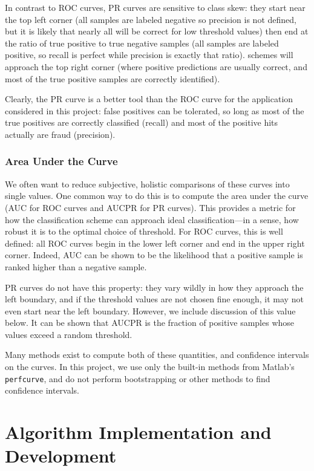 \documentclass{article}
\begin{document}
In contrast to ROC curves, PR curves are sensitive to class skew: they start near the top left corner (all samples are labeled negative so precision is not defined, but it is likely that nearly all will be correct for low threshold values) then end at the ratio of true positive to true negative samples (all samples are labeled positive, so recall is perfect while precision is exactly that ratio).  schemes will approach the top right corner (where positive predictions are usually correct, and most of the true positive samples are correctly identified).

Clearly, the PR curve is a better tool than the ROC curve for the application considered in this project: false positives can be tolerated, so long as most of the true positives are correctly classified (recall) and most of the positive hits actually are fraud (precision).

\subsubsection{Area Under the Curve}
We often want to reduce subjective, holistic comparisons of these curves into single values. One common way to do this is to compute the area under the curve (AUC for ROC curves and AUCPR for PR curves). This provides a metric for how  the classification scheme can approach ideal classification---in a sense, how robust it is to the optimal choice of threshold. For ROC curves, this is well defined: all ROC curves begin in the lower left corner and end in the upper right corner. Indeed, AUC can be shown to be the likelihood that a positive sample is ranked higher than a negative sample\cite{Fawcett}.

PR curves do not have this property: they vary wildly in how they approach the left boundary, and if the threshold values are not chosen fine enough, it may not even start near the left boundary. However, we include discussion of this value below. It can be shown that AUCPR is the fraction of positive samples whose values exceed a random threshold\cite{boyd}.

Many methods exist to compute both of these quantities, and confidence intervals on the curves\cite{boyd}\cite{fawcett}. In this project, we use only the built-in methods from Matlab's \texttt{perfcurve}, and do not perform bootstrapping or other methods to find confidence intervals.

\section{Algorithm Implementation and Development}
\end{document}
